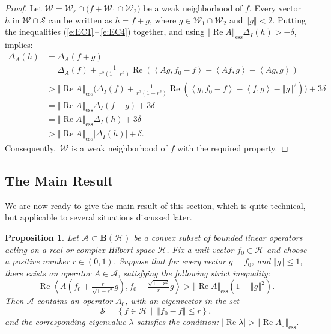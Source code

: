 \documentclass{tran-l}
\newtheorem{prop}[thm]{Proposition}
\theoremstyle{definition}
\theoremstyle{remark}
\numberwithin{equation}{subsection}
\DeclareMathOperator{\RE}{Re}
\DeclareMathOperator{\ess}{ess}
\newcommand{\eps}{\varepsilon}
\newcommand{\h}{\mathcal{H}}
\newcommand{\s}{\mathcal{S}}
\newcommand{\A}{\mathcal{A}}
\newcommand{\W}{\mathcal{W}}
\newcommand{\BH}{\mathbf{B}(\mathcal{H})}
\newcommand{\abs}[1]{\left\vert#1\right\vert}
\newcommand{\set}[1]{\left\{#1\right\}}
\newcommand{\seq}[1]{\left<#1\right>}
\newcommand{\norm}[1]{\left\Vert#1\right\Vert}
\newcommand{\essnorm}[1]{\norm{#1}_{\ess}}
\begin{document}
\begin{proof}
Let $\W = \W_\eps\cap\big(f + \W_1\cap\W_2\big)$ be a weak neighborhood of $f$. Every vector $h$ in $\W\cap\s$ can be written as $h=f+g$, where $g \in \W_1\cap\W_2$ and $\norm{g}<2$. Putting the inequalities (\ref{e:EC1}\,--\,\ref{e:EC4}) together, and using $\essnorm{\RE{A}}\Delta_I(h)>-\delta$, implies:
\begin{align*}
  \Delta_A(h) &= \Delta_A(f+g) \\ &=
  \Delta_A(f) + \tfrac{1}{r^2(1-r^2)}
  \RE( \seq{A g,f_0-f} - \seq{A f,g} - \seq{A g,g})\\ &>
  \essnorm{\RE{A}}\big( \Delta_I(f) +
    \tfrac{1}{r^2(1-r^2)}\RE (\seq{g,f_0-f} - \seq{f,g} -
      \norm{g}^2)\big) + 3\delta\\ &=
  \essnorm{\RE{A}} \Delta_I(f+g) + 3\delta\\ &=
  \essnorm{\RE{A}} \Delta_I(h) + 3\delta\\ &>
  \essnorm{\RE{A}} \abs{\Delta_I(h)} + \delta.
\end{align*}
Consequently,\, $\W$ is a weak neighborhood of $f$ with the required property.
\end{proof}


\subsection{The Main Result}
We are now ready to give the main result of this section, which is quite technical, but applicable to several situations discussed later.

\begin{prop} \label{p:ESS}
Let $\A\subset\BH$ be a convex subset of bounded linear operators acting on a real or complex Hilbert space $\h$. Fix a unit vector $f_0\in\h$ and choose a positive number $r\in(0,1)$. Suppose that for every vector $g\perp{f_0}$, and $\norm{g}\leq1$, there exists an operator $A\in\A$, satisfying the following strict inequality:
\begin{equation}\label{e:ESSCON}
  \RE\seq{A\left(f_0+\tfrac{r}{\sqrt{1-r^2}}g\right),
  f_0-\tfrac{\sqrt{1-r^2}}{r}g} > \essnorm{\RE{A}}(1 - \norm{g}^2).
\end{equation}
Then $\A$ contains an operator $A_0$, with an eigenvector in the set
\[ \s=\set{f\in\h\,\,|\,\,\,\norm{f_0-f}\leq{r}}, \]
and the corresponding eigenvalue $\lambda$ satisfies the condition: $\abs{\RE\lambda}>\essnorm{\RE{A_0}}$.
\end{prop}
\end{document}
